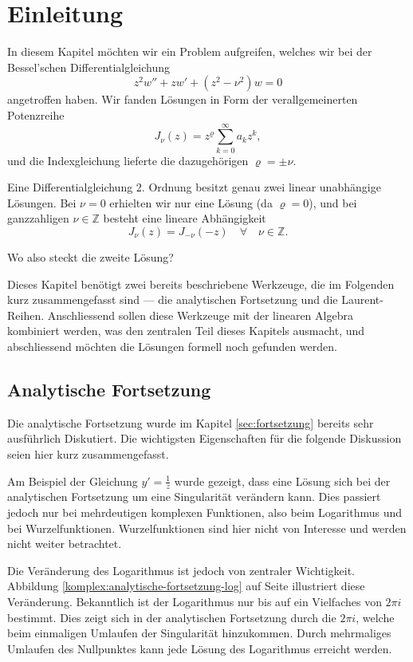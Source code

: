 \section{Einleitung}

In diesem Kapitel möchten wir ein Problem aufgreifen, welches wir bei der Bessel'schen Differentialgleichung
\[ z^2w''+zw'+(z^2 - \nu^2)w=0\]
angetroffen haben. 
Wir fanden Lösungen in Form der verallgemeinerten Potenzreihe
\[J_\nu(z)=z^\varrho\sum_{k=0}^{\infty}a_kz^k,\]
und die Indexgleichung lieferte die dazugehörigen $\varrho=\pm\nu.$

\begin{problem*} 
 Eine Differentialgleichung 2. Ordnung besitzt genau zwei linear unabhängige Lösungen.
 Bei $\nu=0$ erhielten wir nur eine Lösung (da $\varrho=0$), und bei ganzzahligen $\nu\in\mathbb{Z}$ besteht eine lineare Abhängigkeit
 \[J_\nu(z) = J_{-\nu}(-z)\quad\forall\quad\nu\in\mathbb{Z}.\]

Wo also steckt die zweite Lösung?
\end{problem*} 

Dieses Kapitel benötigt zwei bereits beschriebene Werkzeuge, die im Folgenden kurz zusammengefasst sind --- die analytischen Fortsetzung und die Laurent-Reihen.
Anschliessend sollen diese Werkzeuge mit der linearen Algebra kombiniert werden, was den zentralen Teil dieses Kapitels ausmacht, und abschliessend möchten die Lösungen formell noch gefunden werden.

\subsection{Analytische Fortsetzung}
Die analytische Fortsetzung wurde im Kapitel \ref{sec:fortsetzung} bereits sehr ausführlich Diskutiert.
Die wichtigsten Eigenschaften für die folgende Diskussion seien hier kurz zusammengefasst.

Am Beispiel der Gleichung $y'=\frac{1}{z}$ wurde gezeigt, dass eine Lösung sich bei der analytischen Fortsetzung um eine Singularität verändern kann.
Dies passiert jedoch nur bei mehrdeutigen komplexen Funktionen, also beim Logarithmus und bei Wurzelfunktionen.
Wurzelfunktionen sind hier nicht von Interesse und werden nicht weiter betrachtet. 

Die Veränderung des Logarithmus ist jedoch von zentraler Wichtigkeit.
Abbildung \ref{komplex:analytische-fortsetzung-log} auf Seite \pageref{komplex:analytische-fortsetzung-log} illustriert diese Veränderung.
Bekanntlich ist der Logarithmus nur bis auf ein Vielfaches von $2\pi i$ bestimmt.
Dies zeigt sich in der analytischen Fortsetzung durch die $2\pi i$, welche beim einmaligen Umlaufen der Singularität hinzukommen.
Durch mehrmaliges Umlaufen des Nullpunktes kann jede Lösung des Logarithmus erreicht werden.


